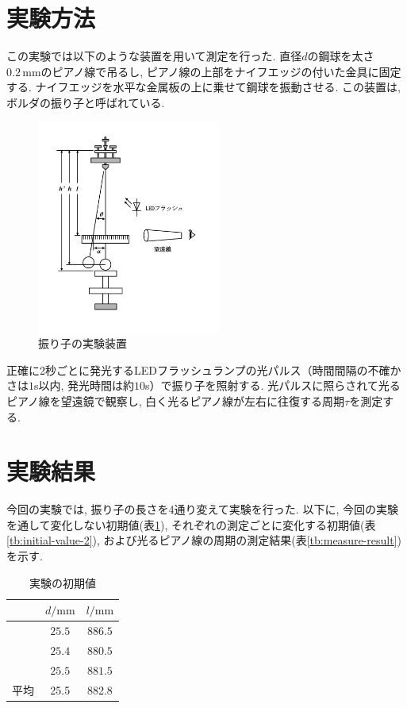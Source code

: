 \documentclass{jarticle}
\begin{document}
\section{実験方法}

この実験では以下のような装置を用いて測定を行った.
直径$d$の鋼球を太さ$0.2\,\mathrm{mm}$のピアノ線で吊るし, ピアノ線の上部をナイフエッジの付いた金具に固定する.
ナイフエッジを水平な金属板の上に乗せて鋼球を振動させる.
この装置は, ボルダの振り子と呼ばれている.

\begin{figure}[H]
  \begin{center}
  \includegraphics[width=60mm]{experimental_method_picture.png}
  \caption{振り子の実験装置}
  \end{center}
\end{figure}

正確に2秒ごとに発光するLEDフラッシュランプの光パルス（時間間隔の不確かさは$1$\textmu s以内, 発光時間は約$10$\textmu s）で振り子を照射する.
光パルスに照らされて光るピアノ線を望遠鏡で観察し, 白く光るピアノ線が左右に往復する周期$\tau$を測定する.


\section{実験結果}

今回の実験では, 振り子の長さを4通り変えて実験を行った.
以下に, 今回の実験を通して変化しない初期値(表\ref{tb:initial-value-1}), それぞれの測定ごとに変化する初期値(表\ref{tb:initial-value-2}), および光るピアノ線の周期の測定結果(表\ref{tb:measure-result})を示す.

\begin{table}[h]
  \centering
  \caption{実験の初期値}
  \begin{tabular}{ccc}
    \hline
    & $d/\mathrm{mm}$ & $l/\mathrm{mm}$\\
    \hline
    & $25.5$ & $886.5$ \\
    & $25.4$ & $880.5$ \\
    & $25.5$ & $881.5$ \\
    \hline
    平均 & 25.5 & 882.8 \\
    \hline
  \end{tabular}
  \label{tb:initial-value-1}
\end{table}
\end{document}

